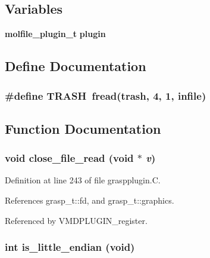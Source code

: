 \subsection*{Variables}
\begin{CompactItemize}
\item 
{\bf molfile\_\-plugin\_\-t} {\bf plugin}
\end{CompactItemize}


\subsection{Define Documentation}
\subsubsection{\setlength{\rightskip}{0pt plus 5cm}\#define TRASH\ fread(trash, 4, 1, infile)}\label{graspplugin_8C_a0}




\subsection{Function Documentation}
\subsubsection{\setlength{\rightskip}{0pt plus 5cm}void close\_\-file\_\-read (void $\ast$ {\em v})\hspace{0.3cm}{\tt  [static]}}\label{graspplugin_8C_a5}




Definition at line 243 of file graspplugin.C.

References grasp\_\-t::fd, and grasp\_\-t::graphics.

Referenced by VMDPLUGIN\_\-register.
\subsubsection{\setlength{\rightskip}{0pt plus 5cm}int is\_\-little\_\-endian (void)\hspace{0.3cm}{\tt  [static]}}\label{graspplugin_8C_a2}




